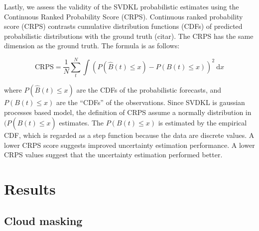 \documentclass[a4paper, nobind]{templates/cdethesis}
\begin{document}
Lastly, we assess the validity of the SVDKL probabilistic estimates using the Continuous Ranked Probability Score (CRPS). Continuous ranked probability score (CRPS) contrasts cumulative distribution functions (CDFs) of predicted probabilistic distributions with the ground truth (citar). The CRPS has the same dimension as the ground truth. The formula is as follows:

\begin{equation}
    \mathrm{CRPS}=\frac{1}{N} \sum_{t}^{N} \int(P(\widehat{B}(t) \leq x)-P(B(t) \leq x))^{2} \mathrm{~d} x
\end{equation}

where \(P(\widehat{B}(t) \leq x)\) are the CDFs of the probabilistic forecasts, and \(P(B(t) \leq x)\) are the ``CDFs'' of the observations. Since SVDKL is gaussian processes based model, the definition of CRPS assume a normally distribution in \((P(\widehat{B}(t) \leq x)\) estimates. The \(P(B(t) \leq x)\) is estimated by the empirical CDF, which is regarded as a step function because the data are discrete values. A lower CRPS score suggests improved uncertainty estimation performance. A lower CRPS values suggest that the uncertainty estimation performed better.

\hypertarget{results}{%
\section{Results}\label{results}}

\label{section:results}

\subsection{Cloud masking}
\end{document}
